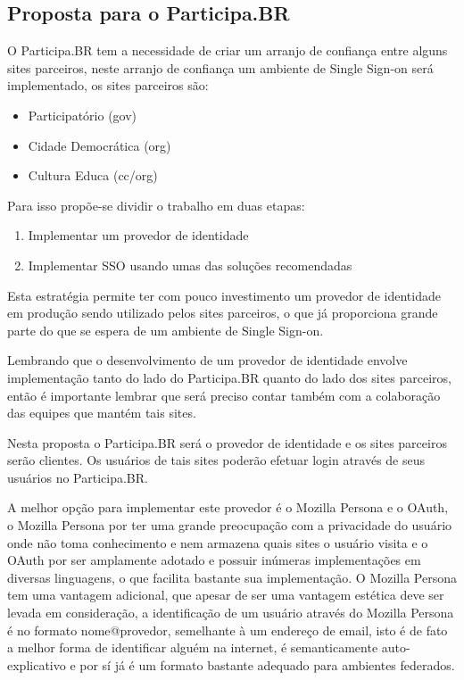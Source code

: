 \documentclass[11pt]{article}
\begin{document}
\subsection{Proposta para o Participa.BR}


O Participa.BR tem a necessidade de criar um arranjo de confiança entre alguns
sites parceiros, neste arranjo de confiança um ambiente de Single Sign-on será
implementado, os sites parceiros são:

\begin{itemize}
  \item{Participatório (gov)}
  \item{Cidade Democrática (org)}
  \item{Cultura Educa (cc/org)}
\end{itemize}


Para isso propõe-se dividir o trabalho em duas etapas:

\begin{enumerate}
  \item{Implementar um provedor de identidade}
  \item{Implementar SSO  usando umas das soluções recomendadas}
\end{enumerate}

Esta estratégia permite ter com pouco investimento um provedor de identidade
em produção sendo utilizado pelos sites parceiros, o que já proporciona grande
parte do que se espera de um ambiente de Single Sign-on.

Lembrando que o desenvolvimento de um provedor de identidade envolve
implementação tanto do lado do Participa.BR quanto do lado dos sites
parceiros, então é importante lembrar que será preciso contar também com a
colaboração das equipes que mantém tais sites.

Nesta proposta o Participa.BR será o provedor de identidade e os sites
parceiros serão clientes. Os usuários de tais sites poderão efetuar login
através de seus usuários no Participa.BR.

A melhor opção para implementar este provedor é o Mozilla Persona e o OAuth, o
Mozilla Persona por ter uma grande preocupação com a privacidade do usuário
onde não toma conhecimento e nem armazena quais sites o usuário visita e
o OAuth por ser amplamente adotado e possuir inúmeras implementações em
diversas linguagens, o que facilita bastante sua implementação. O Mozilla
Persona tem uma vantagem adicional, que apesar de ser uma vantagem estética
deve ser levada em consideração, a identificação de um usuário através do
Mozilla Persona é no formato nome@provedor, semelhante à um endereço de email,
isto é de fato a melhor forma de identificar alguém na internet, é
semanticamente auto-explicativo e por sí já é um formato bastante adequado
para ambientes federados.
\end{document}

